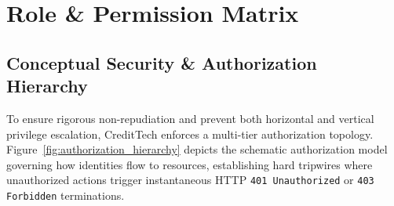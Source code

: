 \chapter{Role \& Permission Matrix}
\label{chap:role_permission_matrix}

\section{Conceptual Security \& Authorization Hierarchy}
To ensure rigorous non-repudiation and prevent both horizontal and vertical privilege escalation, CreditTech enforces a multi-tier authorization topology. Figure~\ref{fig:authorization_hierarchy} depicts the schematic authorization model governing how identities flow to resources, establishing hard tripwires where unauthorized actions trigger instantaneous HTTP \texttt{401 Unauthorized} or \texttt{403 Forbidden} terminations.

